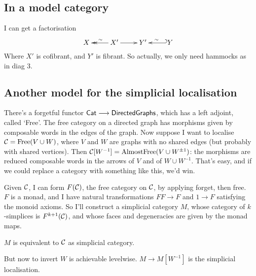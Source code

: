\documentclass[11pt]{article}
\begin{document}
\begin{SaulSimplicialLocalisation}
\subsection*{In a model category}
I can get a factorisation
\[\xymatrix{
X&\ar@{->>}[l]_\sim X'\ar[r]&Y'\ar@{_{(}->}[r];[]_\sim&Y
}\]
Where $X'$ is cofibrant, and $Y'$ is fibrant. So actually, we only need hammocks as in diag 3.
\subsection*{Another model for the simplicial localisation}
There's a forgetful functor $\operatorname{{\mathsf{Cat}}}\longrightarrow\mathsf{DirectedGraphs}$, which has a left adjoint, called `Free'. The free category on a directed graph has morphisms given by composable words in the edges of the graph. Now suppose I want to localise $\mathcal{C}=\text{Free}(V\cup W)$, where $V$ and $W$ are graphs with no shared edges (but probably with shared vertices). Then $\mathcal{C}[W^{-1}]=\text{AlmostFree}(V\cup W^{\pm1})$:  the morphisms are reduced composable words in the arrows of $V$ and of $W\cup W^{-1}$. That's easy, and if we could replace a category with something like this, we'd win.

Given $\mathcal{C}$, I can form $F(\mathcal{C})$, the free category on $\mathcal{C}$, by applying forget, then free. $F$ is a monad, and I have natural transformations $FF\to F$ and $1\to F$ satisfying the monoid axioms. So I'll construct a simplicial category $M$, whose category of $k$-simplices is $F^{k+1}(\mathcal{C})$, and whose faces and degeneracies are given by the monad maps.

\begin{fact}
$M$ is equivalent to $\mathcal{C}$ as  simplicial category.
\end{fact}
\noindent But now to invert $W$ is achievable levelwise. $M\to M[W^{-1}]$ is the simplicial localisation.

\end{SaulSimplicialLocalisation}
\end{document}
